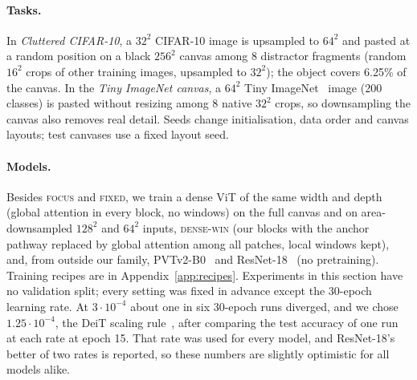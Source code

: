 \documentclass[10pt]{article}
\newcommand{\focus}{\textsc{focus}}
\newcommand{\fixed}{\textsc{fixed}}
\newcommand{\densewin}{\textsc{dense-win}}
\begin{document}
\paragraph{Tasks.} In \emph{Cluttered CIFAR-10}, a $32^2$ CIFAR-10 image is upsampled to $64^2$
and pasted at a random position on a black $256^2$ canvas among 8 distractor fragments (random
$16^2$ crops of other training images, upsampled to $32^2$); the object covers 6.25\% of the
canvas. In the \emph{Tiny ImageNet canvas}, a $64^2$ Tiny ImageNet~\citep{le2015tinyimagenet}
image (200 classes) is pasted without resizing among 8 native $32^2$ crops, so downsampling the
canvas also removes real detail. Seeds change initialisation, data order and canvas layouts; test
canvases use a fixed layout seed.

\paragraph{Models.} Besides \focus{} and \fixed{}, we train a dense ViT of the same width and
depth (global attention in every block, no windows) on the full canvas and on area-downsampled
$128^2$ and $64^2$ inputs, \densewin{} (our blocks with the anchor pathway replaced by global
attention among all patches, local windows kept), and, from outside our family,
PVTv2-B0~\citep{wang2022pvtv2} and ResNet-18~\citep{he2016resnet} (no pretraining). Training
recipes are in Appendix~\ref{app:recipes}. Experiments in this section have no validation split;
every setting was fixed in advance except the 30-epoch learning rate. At $3\cdot10^{-4}$ about
one in six 30-epoch runs diverged, and we chose $1.25\cdot10^{-4}$, the DeiT scaling rule~\citep{touvron2021deit}, after comparing the test
accuracy of one run at each rate at epoch 15. That rate was used for every model, and ResNet-18's
better of two rates is reported, so these numbers are slightly optimistic for all models alike.
\end{document}
